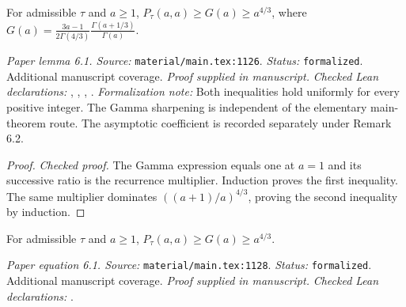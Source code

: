 \renewcommand{\thetheorem}{6.1}
\begin{lemma}
\label{lem:4/3}
\manuscriptproof
{}
\leanok
For admissible $\tau$ and $a\ge1$, $P_\tau(a,a)\ge G(a)\ge a^{4/3}$, where $G(a)=\frac{3a-1}{2\Gamma(4/3)}\frac{\Gamma(a+1/3)}{\Gamma(a)}$.
\end{lemma}

\noindent\textit{Paper lemma 6.1. Source:} \texttt{material/main.tex:1126}.
\textit{Status:} \texttt{formalized}. Additional manuscript coverage.
\textit{Proof supplied in manuscript.}
\textit{Checked Lean declarations:} , , , .
\textit{Formalization note:} Both inequalities hold uniformly for every positive integer. The Gamma sharpening is independent of the elementary main-theorem route. The asymptotic coefficient is recorded separately under Remark 6.2.

\begin{proof}
\leanok
{}
\textit{Checked proof.} The Gamma expression equals one at $a=1$ and its successive ratio is the recurrence multiplier. Induction proves the first inequality. The same multiplier dominates $((a+1)/a)^{4/3}$, proving the second inequality by induction.
\end{proof}

\renewcommand{\thetheorem}{6.1}
\begin{equationresult}
\label{eq:lem4/3}
\manuscriptproof
{}
\leanok
For admissible $\tau$ and $a\ge1$, $P_\tau(a,a)\ge G(a)\ge a^{4/3}$.
\end{equationresult}

\noindent\textit{Paper equation 6.1. Source:} \texttt{material/main.tex:1128}.
\textit{Status:} \texttt{formalized}. Additional manuscript coverage.
\textit{Proof supplied in manuscript.}
\textit{Checked Lean declarations:} .

